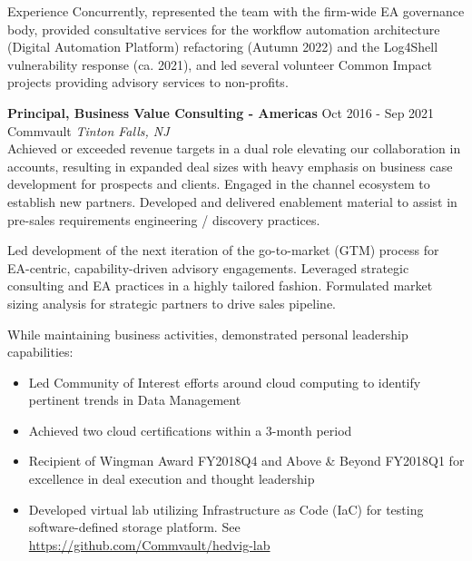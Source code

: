 \documentclass{resume} %
\begin{document}
\begin{rSection}{Experience}
Concurrently, represented the team with the firm-wide EA governance body, provided consultative services for the workflow automation architecture (Digital Automation Platform) refactoring (Autumn 2022) and the Log4Shell vulnerability response (ca. 2021), and led several volunteer Common Impact projects providing advisory services to non-profits.

\textbf{Principal, Business Value Consulting - Americas} \hfill Oct 2016 - Sep 2021\\
Commvault \hfill \textit{Tinton Falls, NJ}\\
Achieved or exceeded revenue targets in a dual role elevating our collaboration in accounts, resulting in expanded deal sizes with heavy emphasis on business case development for prospects and clients. Engaged in the channel ecosystem to establish new partners. Developed and delivered enablement material to assist in pre-sales requirements engineering / discovery practices.

Led development of the next iteration of the go-to-market (GTM) process for EA-centric, capability-driven advisory engagements. Leveraged strategic consulting and EA practices in a highly tailored fashion. Formulated market sizing analysis for strategic partners to drive sales pipeline.

While maintaining business activities, demonstrated personal leadership capabilities:
\begin{itemize}
 \itemsep -3pt {}
    \item Led Community of Interest efforts around cloud computing to identify pertinent trends in Data Management
    \item Achieved two cloud certifications within a 3-month period
    \item Recipient of Wingman Award FY2018Q4 and Above \& Beyond FY2018Q1 for excellence in deal execution and thought leadership
    \item Developed virtual lab utilizing Infrastructure as Code (IaC) for testing software-defined storage platform. See \url{https://github.com/Commvault/hedvig-lab}
\end{itemize}


\end{rSection}
\end{document}
